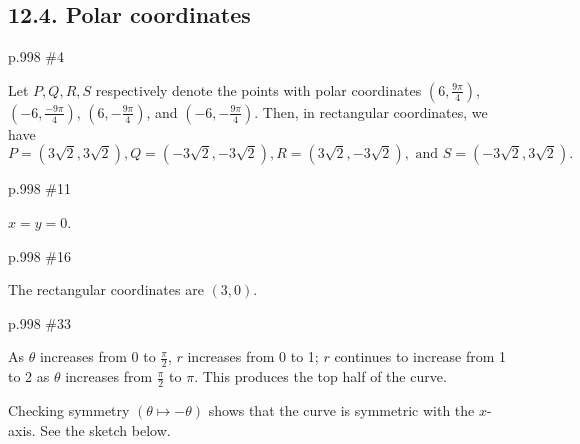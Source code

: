 \subsection{12.4. Polar coordinates}
\begin{practice}p.998 \#4\end{practice}
\begin{pracsol}
  Let $P,Q,R,S$ respectively denote the points with polar coordinates $(6,\frac{9\pi}{4})$, $(-6,\frac{-9\pi}{4})$, $(6,-\frac{9\pi}{4})$, and $(-6,-\frac{9\pi}{4})$. Then, in rectangular coordinates, we have
  \[P=(3\sqrt2,3\sqrt2), Q=(-3\sqrt2,-3\sqrt2), R=(3\sqrt2,-3\sqrt2),\text{ and } S=(-3\sqrt2,3\sqrt2).\]
  \begin{center}
  \end{center}
\end{pracsol}
\begin{practice}p.998 \#11\end{practice}
\begin{pracsol}
  $x=y=0$.
\end{pracsol}
\begin{practice}p.998 \#16\end{practice}
\begin{pracsol}
  The rectangular coordinates are $(3,0)$.
\end{pracsol}
\begin{practice}p.998 \#33\end{practice}
\begin{pracsol}
  As $\theta$ increases from 0 to $\frac{\pi}2$, $r$ increases from 0 to 1; $r$ continues to increase from 1 to 2 as $\theta$ increases from $\frac{\pi}{2}$ to $\pi$. This produces the top half of the curve.

  Checking symmetry $(\theta\mapsto -\theta)$ shows that the curve is symmetric with the $x$-axis. See the sketch below.
  \begin{center}
  \end{center}
\end{pracsol}

